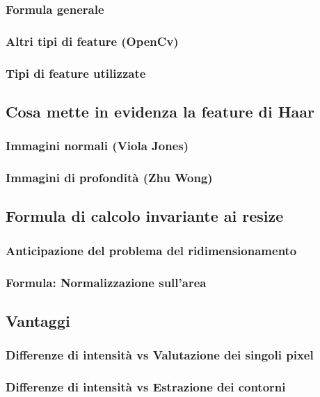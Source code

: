             \subsubsection{Formula generale}
            \subsubsection{Altri tipi di feature (OpenCv)}
            \subsubsection{Tipi di feature utilizzate}
        \subsection{Cosa mette in evidenza la feature di Haar}
            \subsubsection{Immagini normali (Viola Jones)}
            \subsubsection{Immagini di profondità (Zhu Wong)}
        \subsection{Formula di calcolo invariante ai resize}
            \subsubsection{Anticipazione del problema del ridimensionamento}
            \subsubsection{Formula: Normalizzazione sull'area}
        \subsection{Vantaggi}
            \subsubsection{Differenze di intensità vs Valutazione dei singoli pixel}
            \subsubsection{Differenze di intensità vs Estrazione dei contorni}
